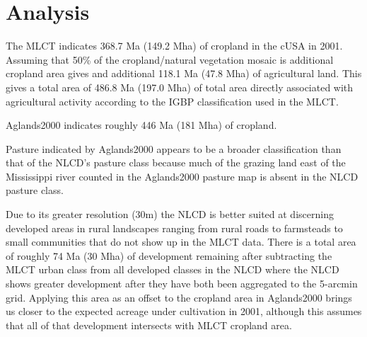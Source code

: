 
\chapter{Analysis} %



\ifpdf
    \graphicspath{{X/figures/PNG/}{X/figures/PDF/}{X/figures/}}
\else
    \graphicspath{{X/figures/EPS/}{X/figures/}}
\fi



The MLCT indicates 368.7 Ma (149.2 Mha) of cropland in the cUSA in 2001.  Assuming that 50\% of the cropland/natural vegetation mosaic is additional cropland area gives and additional 118.1 Ma (47.8 Mha) of agricultural land.  This gives a total area of  486.8 Ma (197.0 Mha) of total area directly associated with agricultural activity according to the IGBP classification used in the MLCT.

Aglands2000 indicates roughly 446 Ma (181 Mha) of cropland.

Pasture indicated by Aglands2000 appears to be a broader classification than that of the NLCD's pasture class because much of the grazing land east of the Mississippi river counted in the Aglands2000 pasture map is absent in the NLCD pasture class.

Due to its greater resolution (30m) the NLCD is better suited at discerning developed areas in rural landscapes ranging from rural roads to farmsteads to small communities that do not show up in the MLCT data.  There is a total area of roughly 74 Ma (30 Mha) of development remaining after subtracting the MLCT urban class from all developed classes in the NLCD where the NLCD shows greater development after they have both been aggregated to the 5-arcmin grid.  Applying this area as an offset to the cropland area in Aglands2000 brings us closer to the expected acreage under cultivation in 2001, although this assumes that all of that development intersects with MLCT cropland area.





